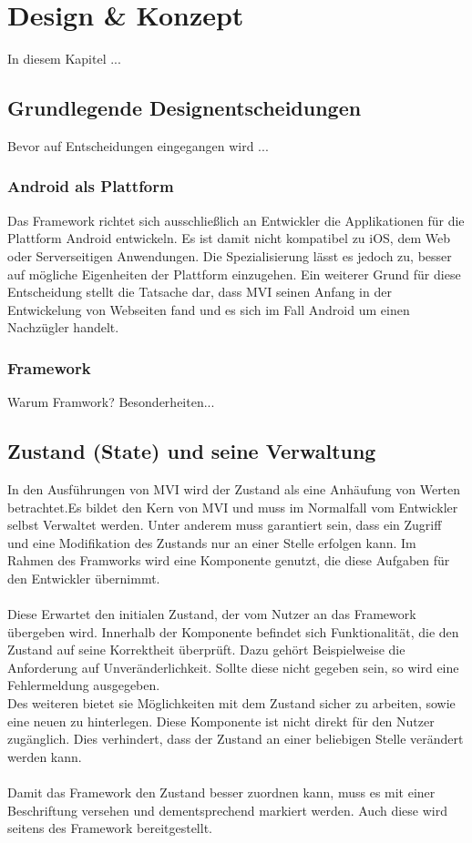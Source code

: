 \section{Design \& Konzept}
\label{sec:design-und-konzept}
In diesem Kapitel ...

\subsection{Grundlegende Designentscheidungen}
Bevor auf Entscheidungen eingegangen wird ...

\subsubsection{Android als Plattform}
Das Framework richtet sich ausschließlich an Entwickler die Applikationen für die Plattform Android entwickeln. Es ist damit nicht kompatibel zu iOS, dem Web oder Serverseitigen Anwendungen. Die Spezialisierung lässt es jedoch zu, besser auf mögliche Eigenheiten der Plattform einzugehen. Ein weiterer Grund für diese Entscheidung stellt die Tatsache dar, dass MVI seinen Anfang in der Entwickelung von Webseiten fand und es sich im Fall Android um einen Nachzügler handelt.

\subsubsection{Framework}
Warum Framwork? Besonderheiten...



\subsection{Zustand (State) und seine Verwaltung}
In den Ausführungen von MVI wird der Zustand als eine Anhäufung von Werten betrachtet.Es bildet den Kern von MVI und muss im Normalfall vom Entwickler selbst Verwaltet werden. Unter anderem muss garantiert sein, dass ein Zugriff und eine Modifikation des Zustands nur an einer Stelle erfolgen kann. Im Rahmen des Framworks wird eine Komponente genutzt, die diese Aufgaben für den Entwickler übernimmt.
\\
\\
Diese Erwartet den initialen Zustand, der vom Nutzer an das Framework übergeben wird. Innerhalb der Komponente befindet sich Funktionalität, die den Zustand auf seine Korrektheit überprüft. Dazu gehört Beispielweise die Anforderung auf Unveränderlichkeit. Sollte diese nicht gegeben sein, so wird eine Fehlermeldung ausgegeben.
\\
Des weiteren bietet sie Möglichkeiten mit dem Zustand sicher zu arbeiten, sowie eine neuen zu hinterlegen. Diese Komponente ist nicht direkt für den Nutzer zugänglich. Dies verhindert, dass der Zustand an einer beliebigen Stelle verändert werden kann.
\\
\\
Damit das Framework den Zustand besser zuordnen kann, muss es mit einer Beschriftung versehen und dementsprechend markiert werden. Auch diese wird seitens des Framework bereitgestellt.

